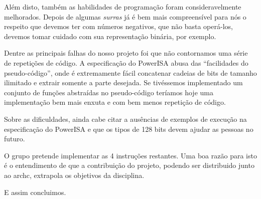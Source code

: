 \documentclass{article}
\begin{document}
Além disto, também as habilidades de programação foram consideravelmente
melhorados. Depois de algumas \textit{surras} já é bem mais
compreensível para nós o respeito que devemos ter com números negativos, 
que não basta operá-los, devemos tomar cuidado com sua representação
binária, por exemplo. 

Dentre as principais falhas do nosso projeto foi que não contornamos
uma série de repetições de código. A especificação do PowerISA abusa das
``facilidades do pseudo-código'', onde é extremamente fácil concatenar
cadeias de bits de tamanho ilimitado e extrair somente a parte
desejada. Se tivéssemos implementado um conjunto de funções abstraídas
no pseudo-código teríamos hoje uma implementação bem mais enxuta e com
bem menos repetição de código. 

Sobre as dificuldades, ainda cabe citar a ausências de exemplos de
execução na especificação do PowerISA e que os tipos de 128 bits devem
ajudar as pessoas no futuro. 

O grupo pretende implementar as 4 instruções restantes. Uma boa razão
para isto é o entendimento de que a contribuição do projeto, podendo
ser distribuido junto ao archc, extrapola os objetivos da
disciplina.  

E assim concluimos. 





\end{document}
